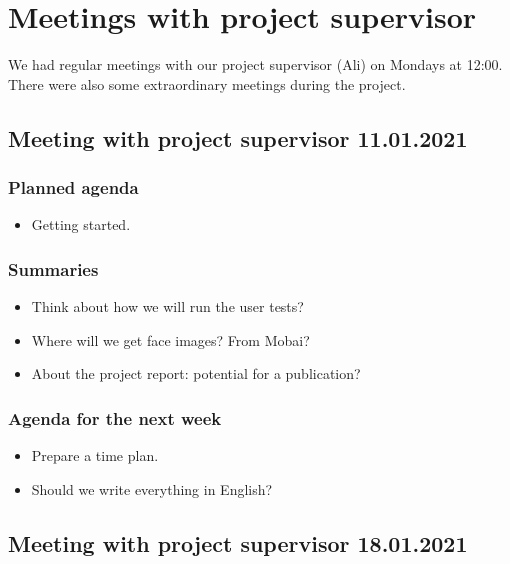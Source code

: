 \chapter{Meetings with project supervisor}

We had regular meetings with our project supervisor (Ali) on Mondays at 12:00. There were also some extraordinary meetings during the project.


\section*{Meeting with project supervisor 11.01.2021}
\subsection*{Planned agenda}
\begin{itemize}
    \item Getting started.
\end{itemize}

\subsection*{Summaries}
\begin{itemize}
    \item Think about how we will run the user tests?
    \item Where will we get face images? From Mobai?
    \item About the project report: potential for a publication?
\end{itemize}

\subsection*{Agenda for the next week}
\begin{itemize}
    \item Prepare a time plan.
    \item Should we write everything in English?
\end{itemize}

\newpage

\section*{Meeting with project supervisor 18.01.2021}
